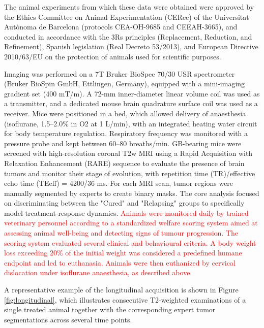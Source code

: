 \documentclass{article}
\begin{document}
The animal experiments from which these data were obtained were approved by the Ethics Committee on Animal Experimentation (CERec) of the Universitat Autòno\-ma de Barcelona (protocols CEA-OH-9685 and CEEAH-3665), and conducted in accordance with the 3Rs principles (Replacement, Reduction, and Refinement), Spanish legislation (Real Decreto 53/2013), and European Directive 2010/63/EU on the protection of animals used for scientific purposes.

Imaging was performed on a 7T Bruker BioSpec 70/30 USR spectrometer (Bruker BioSpin GmbH, Ettlingen, Germany), equipped with a mini-imaging gradient set (400 mT/m). A 72-mm inner-diameter linear volume coil was used as a transmitter, and a dedicated mouse brain quadrature surface coil was used as a receiver. Mice were positioned in a bed, which allowed delivery of anaesthesia (isoflurane, 1.5–2.0\% in O2 at 1 L/min), with an integrated heating water circuit for body temperature regulation. Respiratory frequency was monitored with a pressure probe and kept between 60–80 breaths/min. GB-bearing mice were screened with high-resolution coronal T2w MRI using a Rapid Acquisition with Relaxation Enhancement (RARE) sequence to evaluate the presence of brain tumors and monitor their stage of evolution, with repetition time (TR)/effective echo time (TEeff) = 4200/36 ms. For each MRI scan, tumor regions were manually segmented by experts to create binary masks. The core analysis focused on discriminating between the "Cured" and "Relapsing" groups to specifically model treatment-response dynamics. {\color{black}\textcolor{red}{Animals were monitored daily by trained veterinary personnel according to a standardized welfare scoring system aimed at assessing animal well-being and detecting signs of tumour progression. The scoring system evaluated several clinical and behavioural criteria. A body weight loss exceeding 20\% of the initial weight was considered a predefined humane endpoint and led to euthanasia. Animals were then euthanized by cervical dislocation under isoflurane anaesthesia, as described above.}} 

A representative example of the longitudinal acquisition is shown in Figure \ref{fig:longitudinal}, which illustrates consecutive T2-weighted examinations of a single treated animal together with the corresponding expert tumor segmentations across several time points.
\end{document}
